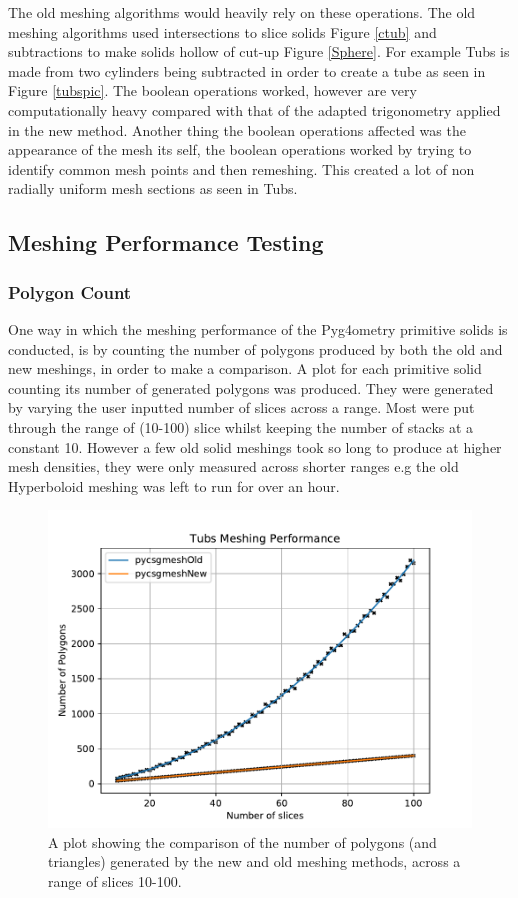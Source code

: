 \documentclass[12pt,a4paper]{article}
\begin{document}
\noindent The old meshing algorithms would heavily rely on these operations. The old meshing algorithms used intersections to slice solids Figure \ref{ctub} and subtractions to make solids hollow of cut-up Figure \ref{Sphere}. For example Tubs is made from two cylinders being subtracted in order to create a tube as seen in Figure \ref{tubspic}. The boolean operations worked, however are very computationally heavy compared with that of the adapted trigonometry applied in the new method. Another thing the boolean operations affected was the appearance of the mesh its self, the boolean operations worked by trying to identify common mesh points and then remeshing. This created a lot of non radially uniform mesh sections as seen in Tubs.\\



\newpage
\subsection{Meshing Performance Testing}
\subsubsection{Polygon Count}
One way in which the meshing performance of the Pyg4ometry primitive solids is conducted, is by counting the number of polygons produced by both the old and new meshings, in order to make a comparison. A plot for each primitive solid counting its number of generated polygons was produced. They were generated by varying the user inputted number of slices across a range. Most were put through the range of (10-100) slice whilst keeping the number of stacks at a constant 10. However a few old solid meshings took so long to produce at higher mesh densities, they were only measured across shorter ranges e.g the old Hyperboloid meshing was left to run for over an hour.  \\

\begin{figure}[h!]
\centering
\includegraphics[scale=0.6]{Images//Quad_fits//Tubs_quad.pdf}
\caption[width=\columnwidth]{A plot showing the comparison of the number of polygons (and triangles) generated by the new and old meshing methods, across a range of slices 10-100.}
\label{conts}
\end{figure}
\end{document}
